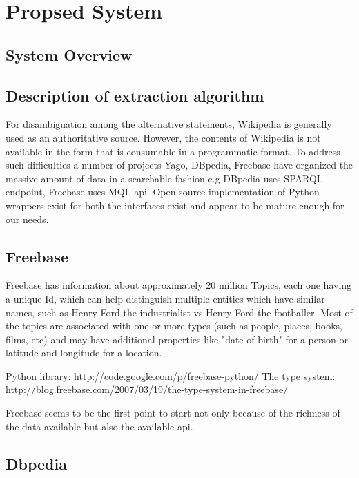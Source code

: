 \documentclass[11pt]{article}
\begin{document}


\section {Propsed System}

\subsection{System Overview}



\subsection{Description of extraction algorithm}

For disambiguation among the alternative statements, Wikipedia is generally used
as an authoritative source. However, the contents of Wikipedia is not available
in the form that is consumable in a programmatic format. To address such
difficulties a number of projects Yago, DBpedia, Freebase have organized the
massive amount of data in a searchable fashion e.g DBpedia uses SPARQL endpoint,
Freebase uses MQL api. Open source implementation of Python wrappers exist for
both the interfaces exist and appear to be mature enough for our needs.

\subsection{Freebase} 
Freebase has information about approximately 20 million Topics,
each one having a unique Id, which can help distinguish multiple entities which
have similar names, such as Henry Ford the industrialist vs Henry Ford the
footballer. Most of the topics are associated with one or more types (such as
people, places, books, films, etc) and may have additional properties like "date
of birth" for a person or latitude and longitude for a location.


Python library: http://code.google.com/p/freebase-python/ The type system:
http://blog.freebase.com/2007/03/19/the-type-system-in-freebase/

Freebase seems to be the first point to start not only because of
the richness of the data available but also the available api. 




\subsection{Dbpedia}
\end{document}
